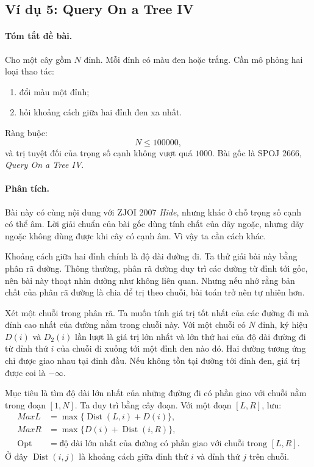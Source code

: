 \documentclass[11pt]{article}
\newcommand{\Opt}{\operatorname{Opt}}
\newcommand{\Dist}{\operatorname{Dist}}
\begin{document}
\subsection{Ví dụ 5: Query On a Tree IV}

\paragraph{Tóm tắt đề bài.}
Cho một cây gồm \(N\) đỉnh. Mỗi đỉnh có màu đen hoặc trắng. Cần mô phỏng hai
loại thao tác:
\begin{enumerate}
  \item đổi màu một đỉnh;
  \item hỏi khoảng cách giữa hai đỉnh đen xa nhất.
\end{enumerate}
Ràng buộc:
\[
  N\le 100000,
\]
và trị tuyệt đối của trọng số cạnh không vượt quá \(1000\). Bài gốc là SPOJ
2666, \textit{Query On a Tree IV}.

\paragraph{Phân tích.}
Bài này có cùng nội dung với ZJOI 2007 \textit{Hide}, nhưng khác ở chỗ trọng
số cạnh có thể âm. Lời giải chuẩn của bài gốc dùng tính chất của dãy ngoặc,
nhưng dãy ngoặc không dùng được khi cây có cạnh âm. Vì vậy ta cần cách khác.

Khoảng cách giữa hai đỉnh chính là độ dài đường đi. Ta thử giải bài này bằng
phân rã đường. Thông thường, phân rã đường duy trì các đường từ đỉnh tới gốc,
nên bài này thoạt nhìn dường như không liên quan. Nhưng nếu nhớ rằng bản chất
của phân rã đường là chia để trị theo chuỗi, bài toán trở nên tự nhiên hơn.

Xét một chuỗi trong phân rã. Ta muốn tính giá trị tốt nhất của các đường đi mà
đỉnh cao nhất của đường nằm trong chuỗi này. Với một chuỗi có \(N\) đỉnh, ký
hiệu \(D(i)\) và \(D_2(i)\) lần lượt là giá trị lớn nhất và lớn thứ hai của
độ dài đường đi từ đỉnh thứ \(i\) của chuỗi đi xuống tới một đỉnh đen nào đó.
Hai đường tương ứng chỉ được giao nhau tại đỉnh đầu. Nếu không tồn tại đường
tới đỉnh đen, giá trị được coi là \(-\infty\).

Mục tiêu là tìm độ dài lớn nhất của những đường đi có phần giao với chuỗi nằm
trong đoạn \([1,N]\). Ta duy trì bằng cây đoạn. Với một đoạn \([L,R]\), lưu:
\[
\begin{aligned}
  \mathit{MaxL} &= \max\{\Dist(L,i)+D(i)\},\\
  \mathit{MaxR} &= \max\{D(i)+\Dist(i,R)\},\\
  \Opt &= \text{độ dài lớn nhất của đường có phần giao với chuỗi trong }[L,R].
\end{aligned}
\]
Ở đây \(\Dist(i,j)\) là khoảng cách giữa đỉnh thứ \(i\) và đỉnh thứ \(j\) trên
chuỗi.
\end{document}
